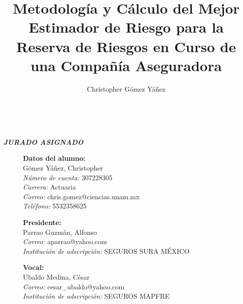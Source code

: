 \documentclass[11pt,twoside,openright,spanish]{report}
\numberwithin{equation}{chapter}
\numberwithin{figure}{chapter}
\numberwithin{table}{chapter}
\renewcommand{\baselinestretch}{1.5}
\newenvironment{changemargin}[3]{
	\begin{list}{}{
			\setlength{\topsep}{#3}
			\setlength{\leftmargin}{#1}
			\setlength{\rightmargin}{#2}
			\setlength{\listparindent}{\parindent}
			\setlength{\itemindent}{\parindent}
			\setlength{\parsep}{\parskip}
		}
		\item[]}{\end{list}}
\begin{document}
	
	\renewcommand{\baselinestretch}{1}
	
	\graphicspath{{./Imagenes/}}
	
	\title{Metodología y Cálculo del Mejor Estimador de Riesgo para la Reserva de Riesgos en Curso de una Compañía Aseguradora}
	\author{Christopher Gómez Yáñez}
	\maketitle
	
	\newpage
	$\ $
	\thispagestyle{empty} %
	
	\begin{changemargin}{1cm}{0cm}{1cm}
		
		\vspace{30cm} 
		\begin{center}
			\textit{\textbf{\Large JURADO ASIGNADO}}
		\end{center}
		\vspace{1cm}
		 
		\begin{description}
			\item[]\textbf{Datos del alumno:}\\
			Gómez Yáñez, Christopher\\
			\textit{Número de cuenta:} 307228305\\
			\textit{Carrera:} Actuaria\\
			\textit{Correo:} chris.gomez@ciencias.unam.mx\\
			\textit{Teléfono:} 5532358625
			
			\item[]\textbf{Presidente:}\\
			Parrao Guzmán, Alfonso\\
			\textit{Correo:} aparrao@yahoo.com\\
			\textit{Institución de adscripción:} SEGUROS SURA MÉXICO
			\item[]\textbf{Vocal:}\\
			Ubaldo Medina, César\\
			\textit{Correo:} cesar\_ubaldo@yahoo.com  \\
			\textit{Institución de adscripción:} SEGUROS MAPFRE


\end{description}
\end{changemargin}
\end{document}
